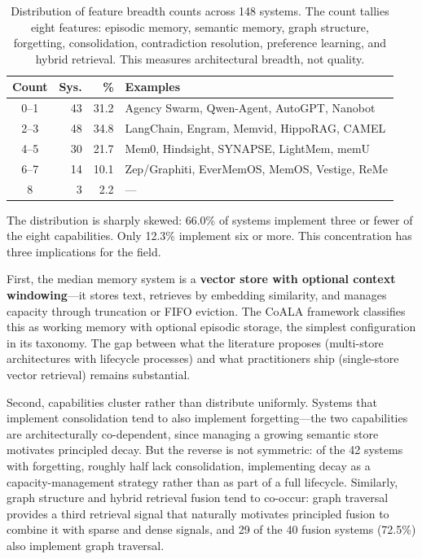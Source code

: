 \begin{table}[!t]
\centering
\caption{Distribution of feature breadth counts across 148 systems.  The count tallies eight features: episodic memory, semantic memory, graph structure, forgetting, consolidation, contradiction resolution, preference learning, and hybrid retrieval.  This measures architectural breadth, not quality.}
\label{tab:capability-distribution}
\small
\begin{tabular}{@{}crrp{3.8cm}@{}}
\toprule
\textbf{Count} & \textbf{Sys.} & \textbf{\%} & \textbf{Examples} \\
\midrule
0--1 & 43 & 31.2 & Agency Swarm, Qwen-Agent, AutoGPT, Nanobot \\
2--3 & 48 & 34.8 & LangChain, Engram, Memvid, HippoRAG, CAMEL \\
4--5 & 30 & 21.7 & Mem0, Hindsight, SYNAPSE, LightMem, memU \\
6--7 & 14 & 10.1 & Zep/Graphiti, EverMemOS, MemOS, Vestige, ReMe \\
8    &  3 &  2.2 & --- \\
\bottomrule
\end{tabular}
\end{table}

The distribution is sharply skewed: 66.0\% of systems implement three or
fewer of the eight capabilities. Only 12.3\% implement six or more. This concentration has three implications for the
field.

First, the median memory system is a \textbf{vector store with optional
context windowing}---it stores text, retrieves by embedding similarity, and
manages capacity through truncation or FIFO eviction. The CoALA framework
\cite{sumers2024coala} classifies this as working memory with optional
episodic storage, the simplest configuration in its taxonomy. The gap between
what the literature proposes (multi-store architectures with lifecycle
processes) and what practitioners ship (single-store vector retrieval) remains
substantial.

Second, capabilities cluster rather than distribute uniformly. Systems that
implement consolidation tend to also implement forgetting---the two capabilities
are architecturally co-dependent, since managing a growing semantic store
motivates principled decay. But the reverse is not symmetric: of the 42 systems
with forgetting, roughly half lack consolidation, implementing decay as a
capacity-management strategy rather than as part of a full lifecycle. Similarly,
graph structure and hybrid retrieval fusion tend to co-occur: graph traversal
provides a third retrieval signal that naturally motivates principled fusion to
combine it with sparse and dense signals, and 29 of the 40 fusion systems
(72.5\%) also implement graph traversal.

